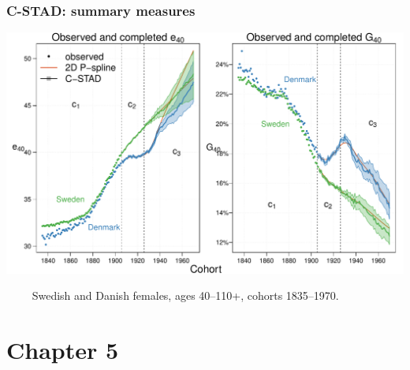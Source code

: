 \documentclass[12pt, xcolor=table]{beamer}  %
\begin{document}
\begin{frame}[noframenumbering]\frametitle{C-STAD: summary measures}
	
\vspace{-0.5cm}


\begin{center}	
	\vspace{0.4cm}
	
	\includegraphics[scale=.41]{Figures/Ch4/F6_3}
	
\end{center}
	
\vspace{-0.15cm}
\tiny{$\quad\quad$ Swedish and Danish females, ages 40--110+, cohorts 1835--1970.}

	
\end{frame}


\section{Chapter 5}
\end{document}
